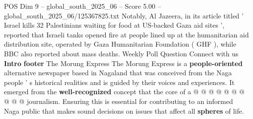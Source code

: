 \begin{textsample}{POS Dim 9 – global\_south\_2025\_06 – Score 5.00 – global\_south\_2025\_06/125367825.txt}
Notably, Al Jazeera, in its article titled ' Israel kills 32 Palestinians waiting for food at US-backed Gaza aid sites ', reported that Israeli tanks opened fire at people lined up at the humanitarian aid distribution site, operated by Gaza Humanitarian Foundation ( GHF ), while BBC also reported about mass deaths.
Weekly Poll Question Connect with us \textbf{Intro} \textbf{footer} The Morung Express The Morung Express is a \textbf{people-oriented} alternative newspaper based in Nagaland that was conceived from the Naga people ' s historical realities and is guided by their voices and experiences.
It emerged from the \textbf{well-recognized} concept that the core of a @ @ @ @ @ @ @ @ @ @ journalism.
Ensuring this is essential for contributing to an informed Naga public that makes sound decisions on issues that affect all \textbf{spheres} of life.

\end{textsample}
